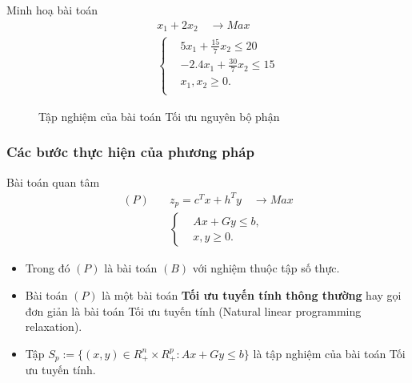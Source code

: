 \documentclass[12pt,a4paper]{report}
\begin{document}
{Minh hoạ bài toán}
   \begin{equation}
        \begin{split}
        \quad & x_1 + 2x_2 \quad \longrightarrow Max \\
                    & \left\{\begin{split}
                    & 5x_1 + \frac{15}{7}x_2 \leq 20 \\
                    & -2.4x_1 + \frac{30}{7}x_2 \leq 15 \\
                    &x_1, x_2 \geq 0. \\
                    \end{split}\right.    
        \end{split}
        \end{equation}            




\begin{figure}
\center	
{}  
\caption{Tập nghiệm của bài toán Tối ưu nguyên bộ phận}
\end{figure}

    
\subsubsection{Các bước thực hiện của phương pháp}

{Bài toán quan tâm}
\begin{equation}\label{P}
\begin{split}
(P) \quad & z_p=c^Tx+h^Ty \quad \longrightarrow Max \\
            & \left\{\begin{split}
                &Ax+Gy \leq  b, \\
                &x,y \geq 0.
            \end{split}\right.    
\end{split}
\end{equation}
\begin{itemize}
\item Trong đó $(P)$ là bài toán $(B)$ với nghiệm thuộc tập số thực.
\item Bài toán $(P)$ là một bài toán \textbf{Tối ưu tuyến tính thông thường} hay gọi đơn giản là bài toán Tối ưu tuyến tính (Natural linear programming relaxation).
\item Tập $S_p:=\{(x,y)\in R^n_+\times R^p_+: Ax+Gy\leq b\}$ là tập nghiệm của bài toán Tối ưu tuyến tính.
\end{itemize}
\end{document}
